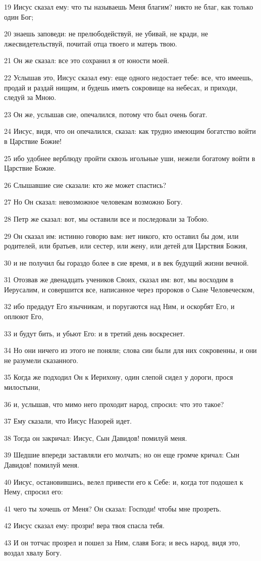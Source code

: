 \par 19 Иисус сказал ему: что ты называешь Меня благим? никто не благ, как только один Бог;
\par 20 знаешь заповеди: не прелюбодействуй, не убивай, не кради, не лжесвидетельствуй, почитай отца твоего и матерь твою.
\par 21 Он же сказал: все это сохранил я от юности моей.
\par 22 Услышав это, Иисус сказал ему: еще одного недостает тебе: все, что имеешь, продай и раздай нищим, и будешь иметь сокровище на небесах, и приходи, следуй за Мною.
\par 23 Он же, услышав сие, опечалился, потому что был очень богат.
\par 24 Иисус, видя, что он опечалился, сказал: как трудно имеющим богатство войти в Царствие Божие!
\par 25 ибо удобнее верблюду пройти сквозь игольные уши, нежели богатому войти в Царствие Божие.
\par 26 Слышавшие сие сказали: кто же может спастись?
\par 27 Но Он сказал: невозможное человекам возможно Богу.
\par 28 Петр же сказал: вот, мы оставили все и последовали за Тобою.
\par 29 Он сказал им: истинно говорю вам: нет никого, кто оставил бы дом, или родителей, или братьев, или сестер, или жену, или детей для Царствия Божия,
\par 30 и не получил бы гораздо более в сие время, и в век будущий жизни вечной.
\par 31 Отозвав же двенадцать учеников Своих, сказал им: вот, мы восходим в Иерусалим, и совершится все, написанное через пророков о Сыне Человеческом,
\par 32 ибо предадут Его язычникам, и поругаются над Ним, и оскорбят Его, и оплюют Его,
\par 33 и будут бить, и убьют Его: и в третий день воскреснет.
\par 34 Но они ничего из этого не поняли; слова сии были для них сокровенны, и они не разумели сказанного.
\par 35 Когда же подходил Он к Иерихону, один слепой сидел у дороги, прося милостыни,
\par 36 и, услышав, что мимо него проходит народ, спросил: что это такое?
\par 37 Ему сказали, что Иисус Назорей идет.
\par 38 Тогда он закричал: Иисус, Сын Давидов! помилуй меня.
\par 39 Шедшие впереди заставляли его молчать; но он еще громче кричал: Сын Давидов! помилуй меня.
\par 40 Иисус, остановившись, велел привести его к Себе: и, когда тот подошел к Нему, спросил его:
\par 41 чего ты хочешь от Меня? Он сказал: Господи! чтобы мне прозреть.
\par 42 Иисус сказал ему: прозри! вера твоя спасла тебя.
\par 43 И он тотчас прозрел и пошел за Ним, славя Бога; и весь народ, видя это, воздал хвалу Богу.

